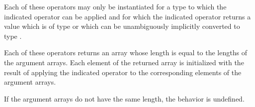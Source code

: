 \begin{itemdescr}
\pnum
Each of these operators may only be instantiated for a type 
to which the indicated operator can be applied and for which the indicated
operator returns a value which is of type  or which
can be unambiguously implicitly converted to type .

\pnum
Each of these operators returns an array whose length is equal to the
lengths of the argument arrays.
Each element of the returned array is
initialized with the result of applying the indicated operator to the
corresponding elements of the argument arrays.

\pnum
If the argument arrays do not have the same length, the behavior is undefined.%
\end{itemdescr}

